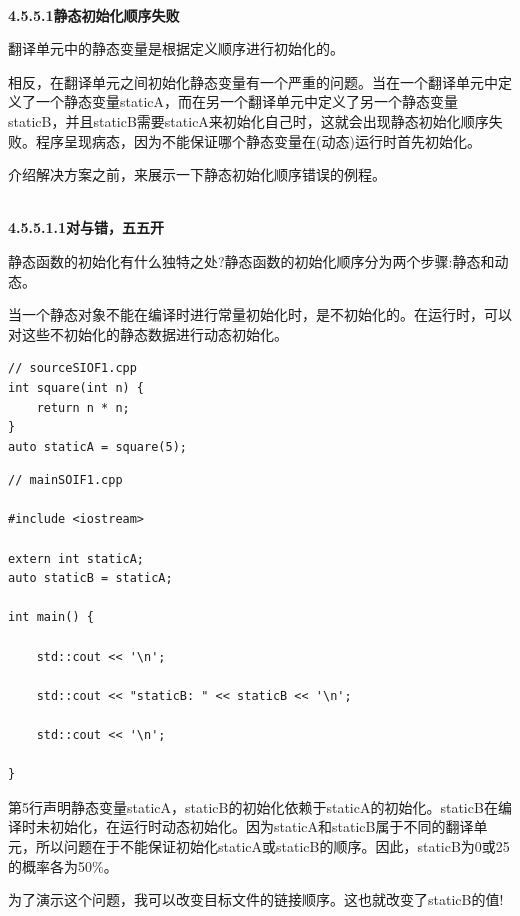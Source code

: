 \hspace*{\fill} \\ %
\noindent
\textbf{4.5.5.1\hspace{0.2cm}静态初始化顺序失败}

翻译单元中的静态变量是根据定义顺序进行初始化的。

相反，在翻译单元之间初始化静态变量有一个严重的问题。当在一个翻译单元中定义了一个静态变量staticA，而在另一个翻译单元中定义了另一个静态变量staticB，并且staticB需要staticA来初始化自己时，这就会出现静态初始化顺序失败。程序呈现病态，因为不能保证哪个静态变量在(动态)运行时首先初始化。

介绍解决方案之前，来展示一下静态初始化顺序错误的例程。

\hspace*{\fill} \\ %
\noindent
\textbf{4.5.5.1.1\hspace{0.2cm}对与错，五五开}

静态函数的初始化有什么独特之处?静态函数的初始化顺序分为两个步骤:静态和动态。

当一个静态对象不能在编译时进行常量初始化时，是不初始化的。在运行时，可以对这些不初始化的静态数据进行动态初始化。

\begin{lstlisting}[style=styleCXX]
// sourceSIOF1.cpp
int square(int n) {
	return n * n;
}
auto staticA = square(5);
\end{lstlisting}

\begin{lstlisting}[style=styleCXX]
// mainSOIF1.cpp

#include <iostream>

extern int staticA;
auto staticB = staticA;

int main() {
	
	std::cout << '\n';
	
	std::cout << "staticB: " << staticB << '\n';
	
	std::cout << '\n';

}
\end{lstlisting}

第5行声明静态变量staticA，staticB的初始化依赖于staticA的初始化。staticB在编译时未初始化，在运行时动态初始化。因为staticA和staticB属于不同的翻译单元，所以问题在于不能保证初始化staticA或staticB的顺序。因此，staticB为0或25的概率各为50\%。

为了演示这个问题，我可以改变目标文件的链接顺序。这也就改变了staticB的值!

